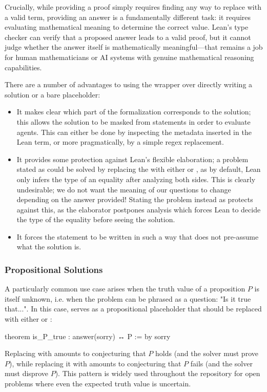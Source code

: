 Crucially, while providing a proof simply requires finding any way to replace  with a valid term, providing an answer is a fundamentally different task: it requires evaluating mathematical meaning to determine the correct value.
Lean's type checker can verify that a proposed answer leads to a valid proof, but it cannot judge whether the answer itself is mathematically meaningful---that remains a job for human mathematicians or AI systems with genuine mathematical reasoning capabilities.

There are a number of advantages to using the  wrapper over directly writing a solution or a bare  placeholder:
\begin{itemize}
\item It makes clear which part of the formalization corresponds to the solution; this allows the solution to be masked from  statements in order to evaluate agents. This can either be done by inspecting the metadata inserted in the Lean term, or more pragmatically, by a simple regex replacement.
\item
    It provides some protection against Lean's flexible elaboration; a problem stated as  could be solved by replacing the  with either  or ,
    as by default, Lean only infers the type of an equality after analyzing both sides.
    This is clearly undesirable; we do not want the meaning of our questions to change depending on the answer provided!
    Stating the problem instead as  protects against this, as the  elaborator postpones analysis which forces Lean to decide the type of the equality before seeing the solution.
\item It forces the statement to be written in such a way that does not pre-assume what the solution is.
\end{itemize}

\subsubsection{Propositional Solutions}

A particularly common use case arises when the truth value of a proposition $P$ is itself unknown, i.e. when the problem can be phrased as a question: "Is it true that...".
In this case,  serves as a propositional placeholder that should be replaced with either  or :
\begin{leancode}
theorem is_P_true : answer(sorry) ↔ P := by
  sorry
\end{leancode}
Replacing  with  amounts to conjecturing that $P$ holds (and the solver must prove $P$),
while replacing it with  amounts to conjecturing that $P$ fails (and the solver must disprove $P$).
This pattern is widely used throughout the repository for open problems where even the expected truth value is uncertain.

